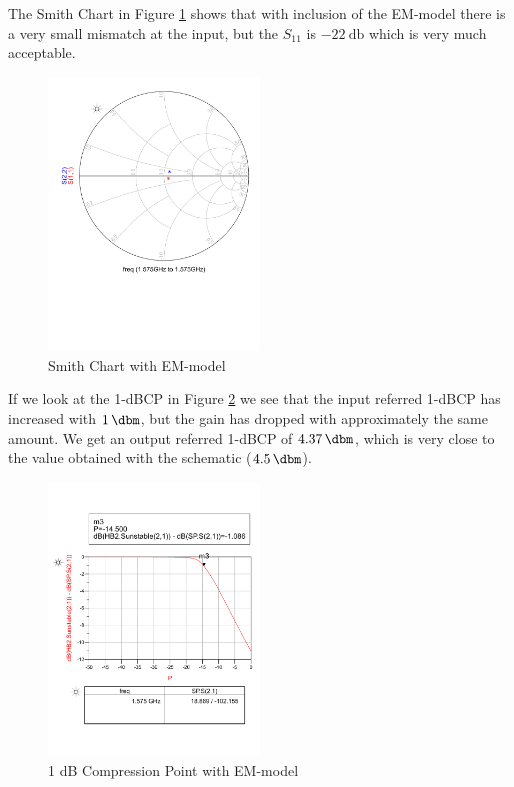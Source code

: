 \documentclass[a4paper]{article}        %
\begin{document}
			The Smith Chart in Figure \ref{fig:lna_smith_post} shows that with inclusion of the EM-model there is a very small mismatch at the input, but the $S_{11}$ is $\SI{-22}{\decibel}$ which is very much acceptable.

			\begin{figure}[H]
			\centering
				\includegraphics[width=0.5\textwidth]{fig/LNA/matching_post.pdf}
			\caption{Smith Chart with EM-model}
			\label{fig:lna_smith_post}
			\end{figure}

			If we look at the 1-dBCP in Figure \ref{fig:lna_1db_post} we see that the input referred 1-dBCP has increased with $\SI{1}{\dbm}$, but the gain has dropped with approximately the same amount. We get an output referred 1-dBCP of $\SI{4.37}{\dbm}$, which is very close to the value obtained with the schematic ($\SI{4.5}{\dbm}$). 

			\begin{figure}[H]
			\centering
				\includegraphics[width=0.5\textwidth]{fig/LNA/compression_post.pdf}
			\caption{1 dB Compression Point with EM-model}
			\label{fig:lna_1db_post}
			\end{figure}
\end{document}
